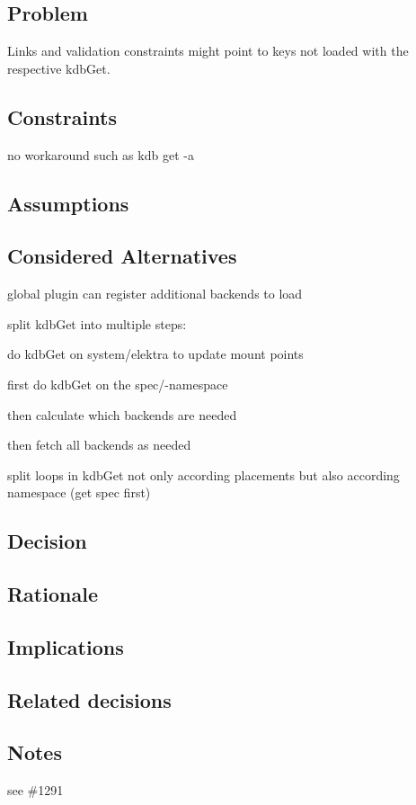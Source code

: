 \subsection*{Problem}

Links and validation constraints might point to keys not loaded with the respective {\ttfamily kdb\+Get}.

\subsection*{Constraints}


\begin{DoxyItemize}
\item no workaround such as {\ttfamily kdb get -\/a}
\end{DoxyItemize}

\subsection*{Assumptions}

\subsection*{Considered Alternatives}


\begin{DoxyItemize}
\item global plugin can register additional backends to load
\item split {\ttfamily kdb\+Get} into multiple steps\+:
\begin{DoxyEnumerate}
\item do {\ttfamily kdb\+Get} on {\ttfamily system/elektra} to update mount points
\item first do {\ttfamily kdb\+Get} on the {\ttfamily spec/}-\/namespace
\item then calculate which backends are needed
\item then fetch all backends as needed
\end{DoxyEnumerate}
\item split loops in {\ttfamily kdb\+Get} not only according placements but also according namespace (get spec first)
\end{DoxyItemize}

\subsection*{Decision}

\subsection*{Rationale}

\subsection*{Implications}

\subsection*{Related decisions}

\subsection*{Notes}

see \#1291 